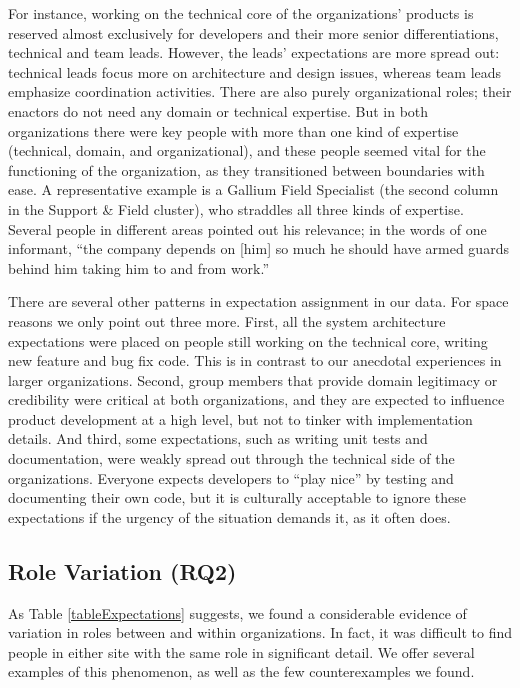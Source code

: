 \documentclass[10pt, conference, compsocconf]{IEEEtran}
\begin{document}
For instance, working on the technical core of the organizations' products is reserved almost exclusively for developers and their more senior differentiations, technical and team leads. However, the leads' expectations are more spread out: technical leads focus more on architecture and design issues, whereas team leads emphasize coordination activities. There are also purely organizational roles; their enactors do not need any domain or technical expertise. But in both organizations there were key people with more than one kind of expertise (technical, domain, and organizational), and these people seemed vital for the functioning of the organization, as they transitioned between boundaries with ease. A representative example is a Gallium Field Specialist (the second column in the Support \& Field cluster), who straddles all three kinds of expertise. Several people in different areas pointed out his relevance; in the words of one informant, ``the company depends on [him] so much he should have armed guards behind him taking him to and from work.''

There are several other patterns in expectation assignment in our data. For space reasons we only point out three more. First, all the system architecture expectations were placed on people still working on the technical core, writing new feature and bug fix code. This is in contrast to our anecdotal experiences in larger organizations. Second, group members that provide domain legitimacy or credibility were critical at both organizations, and they are expected to influence product development at a high level, but not to tinker with implementation details. And third, some expectations, such as writing unit tests and documentation, were weakly spread out through the technical side of the organizations. Everyone expects developers to ``play nice'' by testing and documenting their own code, but it is culturally acceptable to ignore these expectations if the urgency of the situation demands it, as it often does.


\subsection{Role Variation (RQ2)}

As Table \ref{tableExpectations} suggests, we found a considerable evidence of variation in roles between and within organizations. In fact, it was difficult to find people in either site with the same role in significant detail. We offer several examples of this phenomenon, as well as the few counterexamples we found.
\end{document}
